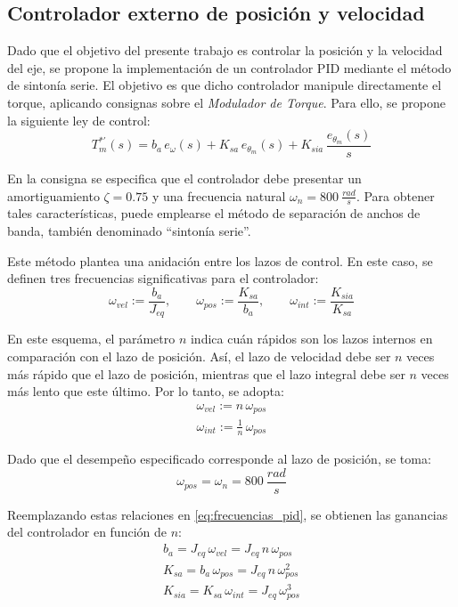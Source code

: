 \documentclass[12pt, a4paper,journal, onecolumn, compsoc]{IEEEtran}
\begin{document}
\subsection{Controlador externo de posición y velocidad}

Dado que el objetivo del presente trabajo es controlar la posición y la velocidad del eje, se propone la implementación de un controlador PID mediante el método de sintonía serie. El objetivo es que dicho controlador manipule directamente el torque, aplicando consignas sobre el \textit{Modulador de Torque}. Para ello, se propone la siguiente ley de control:
\begin{equation}
    T_m^{*\prime}(s)= b_a\,e_\omega(s) + K_{sa}\,e_{\theta_m}(s)+K_{sia}\,\frac{e_{\theta_m}(s)}{s}
\end{equation}

En la consigna se especifica que el controlador debe presentar un amortiguamiento $\zeta = 0.75$ y una frecuencia natural $\omega_n = 800\ \frac{rad}{s}$. Para obtener tales características, puede emplearse el método de separación de anchos de banda, también denominado ``sintonía serie''.

Este método plantea una anidación entre los lazos de control. En este caso, se definen tres frecuencias significativas para el controlador:
\begin{equation}\label{eq:frecuencias_pid}
\omega_{vel}:= \frac{b_a}{J_{eq}}, \qquad
\omega_{pos}:= \frac{K_{sa}}{b_a}, \qquad
\omega_{int}:= \frac{K_{sia}}{K_{sa}}
\end{equation}

En este esquema, el parámetro $n$ indica cuán rápidos son los lazos internos en comparación con el lazo de posición. Así, el lazo de velocidad debe ser $n$ veces más rápido que el lazo de posición, mientras que el lazo integral debe ser $n$ veces más lento que este último. Por lo tanto, se adopta:
\begin{gather}
    \omega_{vel} := n\,\omega_{pos} \\
    \omega_{int} := \frac{1}{n}\,\omega_{pos}
\end{gather}

Dado que el desempeño especificado corresponde al lazo de posición, se toma:
\begin{equation}
    \omega_{pos} = \omega_n = 800\ \frac{rad}{s}
\end{equation}

Reemplazando estas relaciones en \eqref{eq:frecuencias_pid}, se obtienen las ganancias del controlador en función de $n$:
\begin{gather}
    b_a = J_{eq}\,\omega_{vel} = J_{eq}\,n\,\omega_{pos}
    \label{eq:ba_n} \\
    K_{sa} = b_a\,\omega_{pos} = J_{eq}\,n\,\omega_{pos}^2
    \label{eq:ksa_n} \\
    K_{sia} = K_{sa}\,\omega_{int} = J_{eq}\,\omega_{pos}^3
    \label{eq:ksia_n}
\end{gather}
\end{document}
